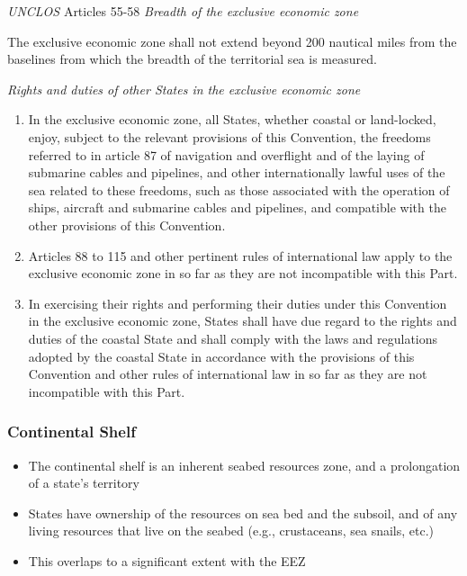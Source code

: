 \begin{conventiondetails}{\textit{UNCLOS} Articles 55-58}
    \textit{Breadth of the exclusive economic zone}

    \vspace{\baselineskip}

    The exclusive economic zone shall not extend beyond 200 nautical miles from the baselines from which the breadth of the territorial sea is measured.

    \textit{Rights and duties of other States in the exclusive economic zone}
    \begin{enumerate}
        \item In the exclusive economic zone, all States, whether coastal or land-locked, enjoy, subject to the relevant provisions of this Convention, the freedoms referred to in article 87 of navigation and overflight and of the laying of submarine cables and pipelines, and other internationally lawful uses of the sea related to these freedoms, such as those associated with the operation of ships, aircraft and submarine cables and pipelines, and compatible with the other provisions of this Convention.
        \item Articles 88 to 115 and other pertinent rules of international law apply to the exclusive economic zone in so far as they are not incompatible with this Part.
        \item In exercising their rights and performing their duties under this Convention in the exclusive economic zone, States shall have due regard to the rights and duties of the coastal State and shall comply with the laws and regulations adopted by the coastal State in accordance with the provisions of this Convention and other rules of international law in so far as they are not incompatible with this Part.
    \end{enumerate}
\end{conventiondetails}

\subsubsection{Continental Shelf}
\begin{itemize}
    \item The continental shelf is an inherent seabed resources zone, and a prolongation of a state's territory
    \item States have ownership of the resources on sea bed and the subsoil, and of any living resources that live on the seabed (e.g., crustaceans, sea snails, etc.)
    \item This overlaps to a significant extent with the EEZ
\end{itemize}

